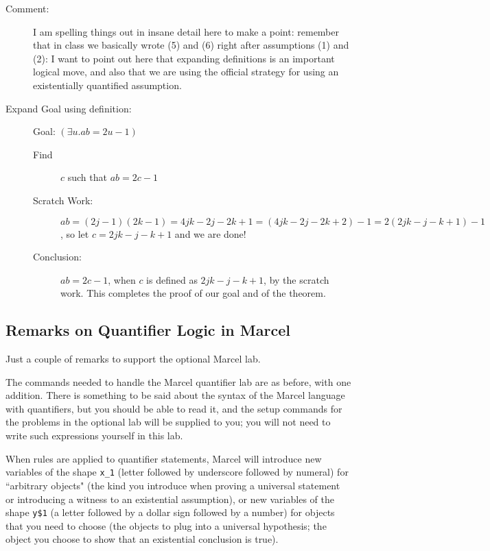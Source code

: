 \documentclass[12pt]{article}
\begin{document}
\begin{description}
\begin{description}
\item[Comment:] I am spelling things out in insane detail here to make
a point: remember that in class we basically wrote (5) and (6) right
after assumptions (1) and (2): I want to point out here that expanding
definitions is an important logical move, and also that we are using
the official strategy for using an existentially quantified
assumption.

\item [Expand Goal using definition:]  Goal: $(\exists u.ab=2u-1)$
\begin{description}
\item [Find] $c$ such that $ab=2c-1$

\item[Scratch Work:] $ab = (2j-1)(2k-1) = 4jk -2j-2k+1 = (4jk-2j-2k+2)-1 = 2(2jk - j -k+1)-1$, so let $c=2jk-j-k+1$ and we are done!

\item[Conclusion:]  $ab=2c-1$, when $c$ is defined as $2jk-j-k+1$, by the scratch work.  This completes the proof of our goal and of the theorem.
\end{description}


\end{description}



\end{description}





\subsection{Remarks on Quantifier Logic in Marcel}

Just a couple of remarks to support the optional Marcel lab.

The commands needed to handle the Marcel quantifier lab are as before, with one addition.  There is something to be said about the syntax of the Marcel language with quantifiers, but you should be able to read it, and the setup commands for the problems in the optional lab will be supplied to you; you will not need to write such expressions yourself in this lab.

When rules are applied to quantifier statements, Marcel will introduce new variables of the shape {\tt x\_1}  (letter followed by underscore followed by numeral) for ``arbitrary objects" (the kind you introduce when proving a universal statement or introducing a witness to an existential assumption), or new variables of the shape {\tt y\$1} (a letter followed by a dollar sign followed by a number) for objects that you need to choose (the objects to plug into a universal hypothesis;  the object you choose to show that an existential conclusion is true).
\end{document}
